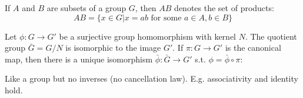 \begin{definition}

  If $A$ and $B$ are subsets of a group $G$, then $AB$ denotes the set of products:
  \[AB = \{x \in G | x = ab \text{ for some } a \in A , b \in B\}\]

\end{definition}

\begin{definition}
  Let $\phi:G \rightarrow G'$ be a surjective group homomorphism with kernel $N$. The
  quotient group $\bar{G}=G/N$ is isomorphic to the image $G'$.
  If $\pi: G \rightarrow G'$ is the canonical map, then there is a unique isomorphism
  $\bar{\phi}:\bar{G} \rightarrow G'$ s.t. $\phi = \bar{\phi} \circ \pi$:



\end{definition}


\begin{definition}
  Like a group but no inverses (no cancellation law). E.g. associativity and
identity hold.

\end{definition}
